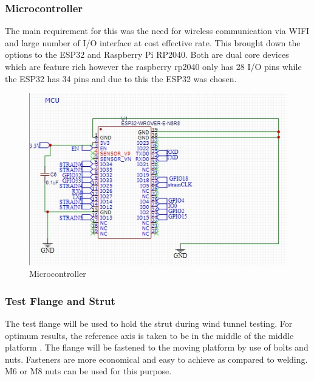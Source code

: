 \subsubsection*{Microcontroller}
The main requirement for this was the need for wireless communication via WIFI and large number of I/O 
interface at cost effective rate. This brought down the options to the ESP32 and 
Raspberry Pi RP2040. Both are dual core devices which are feature rich however the raspberry rp2040 only
 has 28 I/O pins while the ESP32 has 34 pins and due to this the ESP32 was chosen. 
 \begin{center}
	\begin{figure}[H]
	\centering
	\includegraphics[width=0.7\linewidth]{Figures/mcu}
	\caption[Microcontroller]{Microcontroller}
	\end{figure}
\end{center}
\subsubsection{Test Flange and Strut}
The test flange will be used to hold the strut during wind tunnel testing. For optimum results, the reference axis is taken to be in the middle of the middle platform \cite {fernandes_design_nodate}. The flange will be fastened to the moving platform by use of bolts and nuts. Fasteners are more economical and easy to achieve as compared to welding. M6 or M8 nuts can be used for this purpose.

